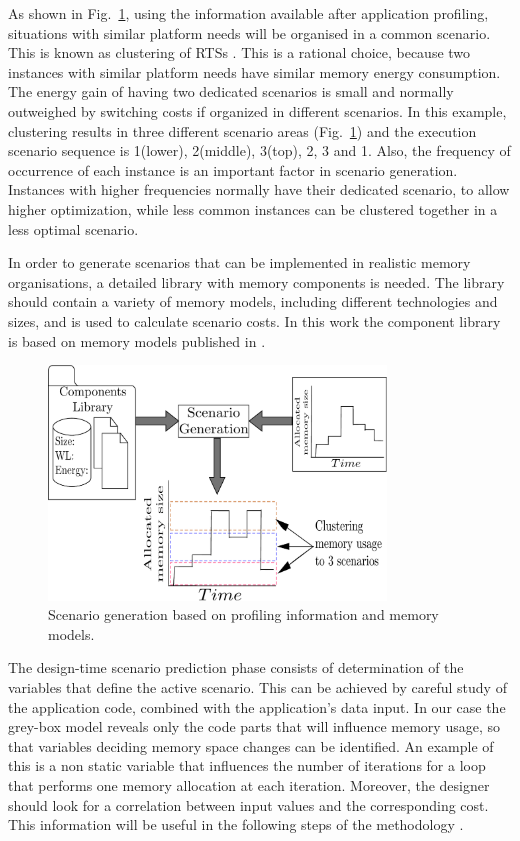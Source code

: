 As shown in Fig.~\ref{fig:clusteringA}, using the information available after application profiling, situations with similar platform needs will be organised in a common scenario. This is known as clustering of RTSs \cite{Gheorghita2007}. This is a rational choice, because two instances with similar platform needs have similar memory energy consumption. The energy gain of having two dedicated scenarios is small and normally outweighed by switching costs if organized in different scenarios. In this example, clustering results in three different scenario areas (Fig.~\ref{fig:clusteringA}) and the execution scenario sequence is 1(lower), 2(middle), 3(top), 2, 3 and 1. Also, the frequency of occurrence of each instance is an important factor in scenario generation. Instances with higher frequencies normally have their dedicated scenario, to allow higher optimization, while less common instances can be clustered together in a less optimal scenario. 

In order to generate scenarios that can be implemented in realistic memory organisations, a detailed library with memory components is needed. The library should contain a variety of memory models, including different technologies and sizes, and is used to calculate scenario costs. In this work the component library is based on memory models published in \cite{Artes2011}.

\begin{figure}[!t]
\centering
\includegraphics[width=0.8\textwidth]{A/clustering_v2-eps-converted-to.pdf}
\caption{Scenario generation based on profiling information and memory models.}
\label{fig:clusteringA}
\end{figure}

The design-time scenario prediction phase consists of determination of the variables that define the active scenario. This can be achieved by careful study of the application code, combined with the application's data input. In our case the grey-box model reveals only the code parts that will influence memory usage, so that variables deciding memory space changes can be identified. An example of this is a non static variable that influences the number of iterations for a loop that performs one memory allocation at each iteration. Moreover, the designer should look for a correlation between input values and the corresponding cost. This information will be useful in the following steps of the methodology \cite{tcm}.

